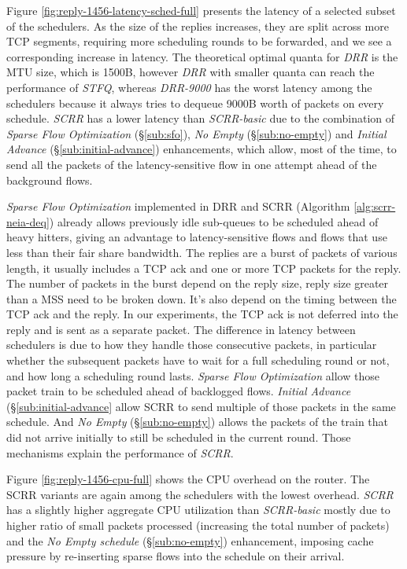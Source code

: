 Figure \ref{fig:reply-1456-latency-sched-full} presents the latency of
a selected subset of the schedulers. As the size of the replies
increases, they are split across more TCP segments, requiring more
scheduling rounds to be forwarded, and we see a corresponding increase
in latency. The theoretical optimal quanta for \textit{DRR} is the MTU
size, which is 1500B, however \textit{DRR} with smaller quanta can
reach the performance of \textit{STFQ}, whereas \textit{DRR-9000} has
the worst latency among the schedulers because it always tries to
dequeue 9000B worth of packets on every schedule. \textit{SCRR} has
a lower latency than \textit{SCRR-basic} due to the combination of
\textit{Sparse Flow
  Optimization} (\S\ref{sub:sfo}), \textit{No Empty}
(\S\ref{sub:no-empty}) and \textit{Initial Advance}
(\S\ref{sub:initial-advance}) enhancements, which allow, most of the
time, to send all the packets of the latency-sensitive flow in one
attempt ahead of the background flows.

\textit{Sparse Flow Optimization} implemented in DRR and SCRR
(Algorithm \ref{alg:scrr-neia-deq}) already allows previously idle
sub-queues to be scheduled ahead of heavy hitters, giving an advantage
to latency-sensitive flows and flows that use less than their fair
share bandwidth. The replies are a burst of packets of various length,
it usually includes a TCP ack and one or more TCP packets for the
reply. The number of packets in the burst depend on the reply size,
reply size greater than a MSS need to be broken down. It's also depend
on the timing between the TCP ack and the reply. In our experiments,
the TCP ack is not deferred into the reply and is sent as a separate
packet. The difference in latency between schedulers is due to how
they handle those consecutive packets, in particular whether the
subsequent packets have to wait for a full scheduling round or not,
and how long a scheduling round lasts. \textit{Sparse Flow
  Optimization} allow those packet train to be scheduled ahead of
backlogged flows. \textit{Initial Advance}
(\S\ref{sub:initial-advance} allow SCRR to send multiple of those
packets in the same schedule. And \textit{No Empty}
(\S\ref{sub:no-empty}) allows the packets of the train that did not
arrive initially to still be scheduled in the current round. Those
mechanisms explain the performance of \textit{SCRR}.

Figure \ref{fig:reply-1456-cpu-full} shows the CPU overhead on the
router. The SCRR variants are again among the schedulers with the
lowest overhead. \textit{SCRR} has a slightly higher aggregate CPU
utilization than \textit{SCRR-basic} mostly due to higher ratio of
small packets processed (increasing the total number of packets) and
the \textit{No Empty schedule} (\S\ref{sub:no-empty}) enhancement,
imposing cache pressure by re-inserting sparse flows into the schedule
on their arrival.

